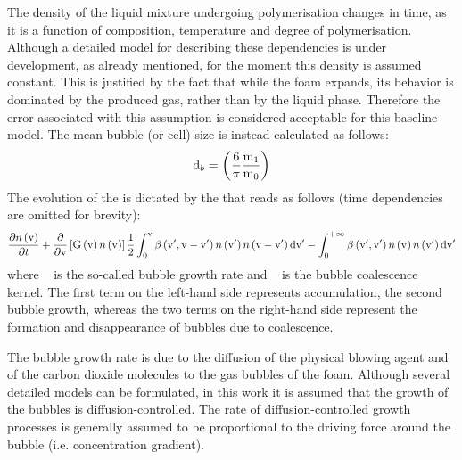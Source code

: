 The density of the liquid mixture undergoing polymerisation changes in time, as it is a function of composition, temperature and degree of polymerisation. 
Although a detailed model for describing these dependencies is under development, as already mentioned, for the moment this density is assumed constant. 
This is justified by the fact that while the foam expands, its behavior is dominated by the produced gas, rather than by the liquid phase. 
Therefore the error associated with this assumption is considered acceptable for this baseline model. 
The mean bubble (or cell) size is instead calculated as follows:
\begin{equation}
    \mathrm{d}_b = \left( \frac{6}{\pi} \frac{\mathrm{m}_{1}}{\mathrm{m}_{0}} \right)
\end{equation}
The evolution of the {\BubbleSizeDistribution} is dictated by the {\PopulationBalanceEquation} that reads as follows (time dependencies are omitted for brevity):
\begin{equation}
    \frac{\partial n\left({\mathrm{v}}\right) }{ \partial t} + 
    \frac{\partial }{ \partial \mathrm{v}} \left[ 
                                                  {\mathrm{G}}\left( \mathrm{v} \right) 
                                                  n\left({\mathrm{v}}\right)
                                              \right] 
    \frac{1}{2} 
    \int_{0}^{\mathrm{v}}
        {\beta}\left( \mathrm{v}', \mathrm{v} - \mathrm{v}' \right) 
        n\left({\mathrm{v}'}\right)
        n\left({\mathrm{v} - \mathrm{v}'}\right)
        \mathrm{d}\mathrm{v}' - 
    \int_{0}^{+\infty}
        {\beta}\left( \mathrm{v}', \mathrm{v}' \right) 
        n\left({\mathrm{v}}\right)
        n\left({\mathrm{v}'}\right)
        \mathrm{d}\mathrm{v}'
\end{equation}
where {~\BubbleGrowthRate} is the so-called bubble growth rate and {~\CoalescenceKernel} is the bubble coalescence kernel.
The first term on the left-hand side represents accumulation, the second bubble growth, whereas the two terms on the right-hand side represent the formation and disappearance of bubbles due to coalescence.
%
\par
%
The bubble growth rate is due to the diffusion of the physical blowing agent and of the carbon dioxide molecules to the gas bubbles of the foam. 
Although several detailed models can be formulated, in this work it is assumed that the growth of the bubbles is diffusion-controlled. The rate of diffusion-controlled growth processes is generally assumed to be proportional to the driving force around the bubble (i.e. concentration gradient). 
